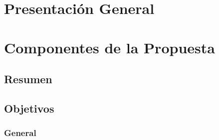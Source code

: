 \documentclass[english, a4paper, 12pt, twoside]{article}
\numberwithin{equation}{section} %
\def\biblio{\clearpage} %
\begin{document}
\def\biblio{} %


\restoregeometry %

\thispagestyle{plain} %
\clearpage\mbox{}\clearpage %



\newpage
{ %
\tableofcontents
}

 

\newpage
{} %
\setcounter{page}{1} %

\section{Presentación General}
    
\section{Componentes de la Propuesta}
    \subsection{Resumen}
        
    \subsection{Objetivos}
        \subsubsection{General}
            
\end{document}
